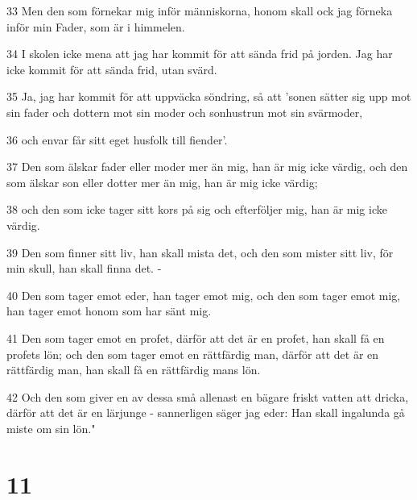 \par 33 Men den som förnekar mig inför människorna, honom skall ock jag förneka inför min Fader, som är i himmelen.
\par 34 I skolen icke mena att jag har kommit för att sända frid på jorden. Jag har icke kommit för att sända frid, utan svärd.
\par 35 Ja, jag har kommit för att uppväcka söndring, så att 'sonen sätter sig upp mot sin fader och dottern mot sin moder och sonhustrun mot sin svärmoder,
\par 36 och envar får sitt eget husfolk till fiender'.
\par 37 Den som älskar fader eller moder mer än mig, han är mig icke värdig, och den som älskar son eller dotter mer än mig, han är mig icke värdig;
\par 38 och den som icke tager sitt kors på sig och efterföljer mig, han är mig icke värdig.
\par 39 Den som finner sitt liv, han skall mista det, och den som mister sitt liv, för min skull, han skall finna det. -
\par 40 Den som tager emot eder, han tager emot mig, och den som tager emot mig, han tager emot honom som har sänt mig.
\par 41 Den som tager emot en profet, därför att det är en profet, han skall få en profets lön; och den som tager emot en rättfärdig man, därför att det är en rättfärdig man, han skall få en rättfärdig mans lön.
\par 42 Och den som giver en av dessa små allenast en bägare friskt vatten att dricka, därför att det är en lärjunge - sannerligen säger jag eder: Han skall ingalunda gå miste om sin lön."

\chapter{11}

